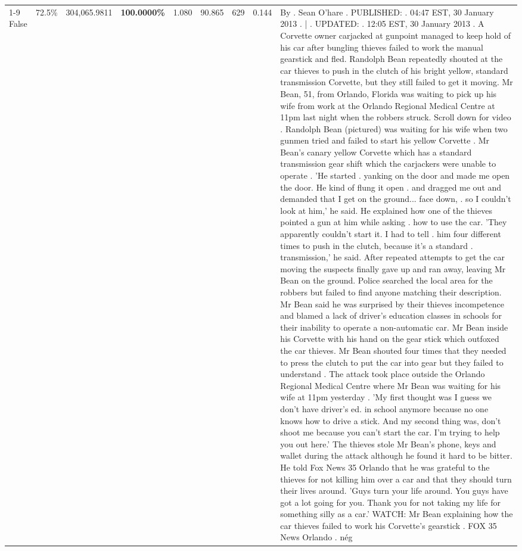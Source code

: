 \begin{table}[H]
\begin{tabular}{lllrlllll}
\cline{1-9} \cline{2-9}
False & 72.5\% & 304,065.9811 & \bfseries \color{red} 100.0000\% & 1.080 & 90.865 & 629 & 0.144 & By . Sean O'hare . PUBLISHED: . 04:47 EST, 30 January 2013 . | . UPDATED: . 12:05 EST, 30 January 2013 . A Corvette owner carjacked at gunpoint managed to keep hold of his car after bungling thieves failed to work the manual gearstick and fled. Randolph Bean repeatedly shouted at the car thieves to push in the clutch of his bright yellow, standard transmission Corvette, but they still failed to get it moving. Mr Bean, 51, from Orlando, Florida was waiting to pick up his wife from work at the Orlando Regional Medical Centre at 11pm last night when the robbers struck. Scroll down for video . Randolph Bean (pictured) was waiting for his wife when two gunmen tried and failed to start his yellow Corvette . Mr Bean's canary yellow Corvette which has a standard transmission gear shift which the carjackers were unable to operate . 'He started . yanking on the door and made me open the door. He kind of flung it open . and dragged me out and demanded that I get on the ground... face down, . so I couldn't look at him,' he said. He explained how one of the thieves pointed a gun at him while asking . how to use the car. 'They apparently couldn't start it. I had to tell . him four different times to push in the clutch, because it's a standard . transmission,' he said. After repeated attempts to get the car moving the suspects finally gave up and ran away, leaving Mr Bean on the ground. Police searched the local area for the robbers but failed to find anyone matching their description. Mr Bean said he was surprised by their thieves incompetence and blamed a lack of driver's education classes in schools for their inability to operate a non-automatic car. Mr Bean inside his Corvette with his hand on the gear stick which outfoxed the car thieves. Mr Bean shouted four times that they needed to press the clutch to put the car into gear but they failed to understand . The attack took place outside the Orlando Regional Medical Centre where Mr Bean was waiting for his wife at 11pm yesterday . 'My first thought was I guess we don't have driver's ed. in school anymore because no one knows how to drive a stick. And my second thing was, don't shoot me because you can't start the car. I'm trying to help you out here.' The thieves stole Mr Bean's phone, keys and wallet during the attack although he found it hard to be bitter. He told Fox News 35 Orlando that he was grateful to the thieves for not killing him over a car and that they should turn their lives around. 'Guys turn your life around. You guys have got a lot going for you. Thank you for not taking my life for something silly as a car.' WATCH: Mr Bean explaining how the car thieves failed to work his Corvette's gearstick . FOX 35 News Orlando . nég \\

\end{tabular}
\end{table}
